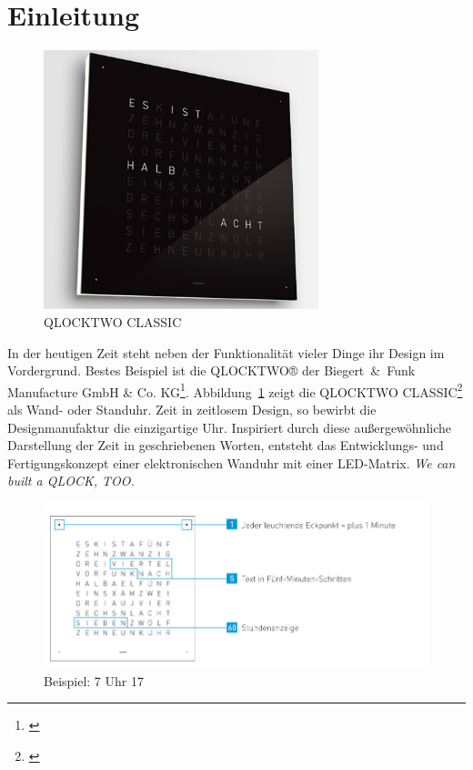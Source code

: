 
\section{Einleitung}
\label{sec:Einleitung}

\begin{figure}[t]
    \centering
    \includegraphics[width=8cm]{Abbildungen/qlocktwo-wand}
    \caption[ClockTwo]{QLOCKTWO CLASSIC}
    \label{fig:ClockTwo}
\end{figure}
%
 \begin{multicols}{2}
 In der heutigen Zeit steht neben der Funktionalität vieler Dinge ihr Design im Vordergrund. Bestes Beispiel ist die QLOCKTWO® der Biegert~\&~Funk Manufacture GmbH \& Co. KG\footnote{\cite{Bie 13}}. Abbildung~\ref{fig:ClockTwo} zeigt die QLOCKTWO CLASSIC\footnote{\cite{Bie 13}} als Wand- oder Standuhr. %
 Zeit in zeitlosem Design, so bewirbt die Designmanufaktur die einzigartige Uhr.  Inspiriert durch diese außergewöhnliche Darstellung der Zeit in geschriebenen Worten, entsteht das Entwicklungs- und Fertigungskonzept einer elektronischen Wanduhr mit einer LED-Matrix. \textit{We can built a QLOCK, TOO.}
 \end{multicols}
 \begin{figure}[h]
    \centering
    \includegraphics[width=12cm]{Abbildungen/Uhrzeit_Beispiel}
    \caption[Uhrzeit_Bspl]{Beispiel: 7 Uhr 17}
    \label{fig:Uhrzeit_Bspl}
\end{figure}
